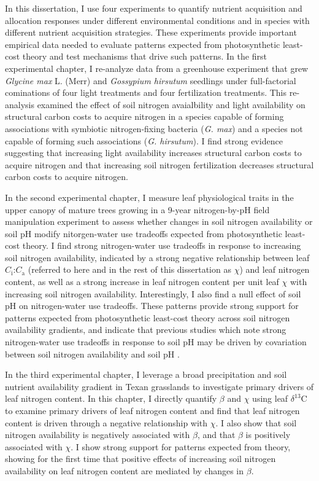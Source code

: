 In this dissertation, I use four experiments to quantify nutrient acquisition and allocation responses under different environmental conditions and in species with different nutrient acquisition strategies. These experiments provide important empirical data needed to evaluate patterns expected from photosynthetic least-cost theory and test mechanisms that drive such patterns. In the first experimental chapter, I re-analyze data from a greenhouse experiment that grew \textit{Glycine max} L. (Merr) and \textit{Gossypium hirsutum} seedlings under full-factorial cominations of four light treatments and four fertilization treatments. This re-analysis examined the effect of soil nitrogen avaialbility and light availability on structural carbon costs to acquire nitrogen in a species capable of forming associations with symbiotic nitrogen-fixing bacteria (\textit{G. max}) and a species not capable of forming such associations (\textit{G. hirsutum}). I find strong evidence suggesting that increasing light availability increases structural carbon costs to acquire nitrogen and that increasing soil nitrogen fertilization decreases structural carbon costs to acquire nitrogen.

In the second experimental chapter, I measure leaf physiological traits in the upper canopy of mature trees growing in a 9-year nitrogen-by-pH field manipulation experiment to assess whether changes in soil nitrogen availability or soil pH modify nitorgen-water use tradeoffs expected from photosynthetic least-cost theory. I find strong nitrogen-water use tradeoffs in response to increasing soil nitrogen availability, indicated by a strong negative relationship between leaf $C_\mathrm{i}$:$C_\mathrm{a}$ (referred to here and in the rest of this dissertation as $\chi$) and leaf nitrogen content, as well as a strong increase in leaf nitrogen content per unit leaf $\chi$ with increasing soil nitrogen availability. Interestingly, I also find a null effect of soil pH on nitrogen-water use tradeoffs. These patterns provide strong support for patterns expected from photosynthetic least-cost theory across soil nitrogen availability gradients, and indicate that previous studies which note strong nitrogen-water use tradeoffs in response to soil pH may be driven by covariation between soil nitrogen availability and soil pH .

In the third experimental chapter, I leverage a broad precipitation and soil nutrient availability gradient in Texan grasslands to investigate primary drivers of leaf nitrogen content. In this chapter, I directly quantify $\beta$ and $\chi$ using leaf $\delta^{13}$C to examine primary drivers of leaf nitrogen content and find that leaf nitrogen content is driven through a negative relationship with $\chi$. I also show that soil nitrogen availability is negatively associated with $\beta$, and that $\beta$ is positively associated with $\chi$. I show strong support for patterns expected from theory, showing for the first time that positive effects of increasing soil nitrogen availability on leaf nitrogen content are mediated by changes in $\beta$.

